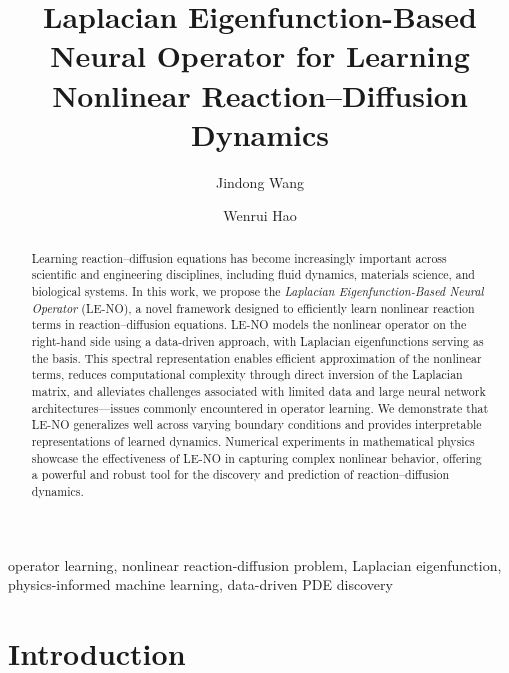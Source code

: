 \documentclass[preprint,12pt]{elsarticle}
\theoremstyle{plain}
\numberwithin{figure}{section}
\numberwithin{table}{section}
\begin{document}


\title{Laplacian Eigenfunction-Based Neural Operator for Learning Nonlinear Reaction–Diffusion Dynamics}
\author[l1]{Jindong Wang}
\author[l1]{Wenrui Hao}



\begin{abstract}
Learning reaction--diffusion equations has become increasingly important across scientific and engineering disciplines, including fluid dynamics, materials science, and biological systems. In this work, we propose the \textit{Laplacian Eigenfunction-Based Neural Operator} (LE-NO), a novel framework designed to efficiently learn nonlinear reaction terms in reaction--diffusion equations. LE-NO models the nonlinear operator on the right-hand side using a data-driven approach, with Laplacian eigenfunctions serving as the basis. This spectral representation enables efficient approximation of the nonlinear terms, reduces computational complexity through direct inversion of the Laplacian matrix, and alleviates challenges associated with limited data and large neural network architectures---issues commonly encountered in operator learning. We demonstrate that LE-NO generalizes well across varying boundary conditions and provides interpretable representations of learned dynamics. Numerical experiments in mathematical physics showcase the effectiveness of LE-NO in capturing complex nonlinear behavior, offering a powerful and robust tool for the discovery and prediction of reaction--diffusion dynamics.
\end{abstract}


\begin{keyword}
operator learning, nonlinear reaction-diffusion problem, Laplacian eigenfunction, physics-informed machine learning, data-driven PDE discovery

\end{keyword}
\maketitle



\section{Introduction}\label{sec:intro}
\end{document}
